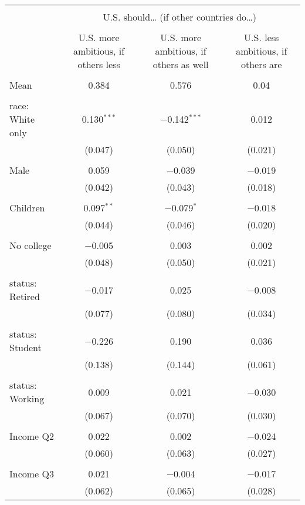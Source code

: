 
\begin{tabular}{@{\extracolsep{5pt}}lccc} 
\\[-1.8ex]\hline 
\hline \\[-1.8ex] 
 & \multicolumn{3}{c}{U.S. should… (if other countries do…)} \\ 
\cline{2-4} 
\\[-1.8ex] & U.S. more ambitious, if others less & U.S. more ambitious, if others as well & U.S. less ambitious, if others are \\ 
\hline \\[-1.8ex] 
 Mean & 0.384 & 0.576 & 0.04  \\ \hline \\[-1.8ex] race: White only & 0.130$^{***}$ & $-$0.142$^{***}$ & 0.012 \\ 
  & (0.047) & (0.050) & (0.021) \\ 
  & & & \\ 
 Male & 0.059 & $-$0.039 & $-$0.019 \\ 
  & (0.042) & (0.043) & (0.018) \\ 
  & & & \\ 
 Children & 0.097$^{**}$ & $-$0.079$^{*}$ & $-$0.018 \\ 
  & (0.044) & (0.046) & (0.020) \\ 
  & & & \\ 
 No college & $-$0.005 & 0.003 & 0.002 \\ 
  & (0.048) & (0.050) & (0.021) \\ 
  & & & \\ 
 status: Retired & $-$0.017 & 0.025 & $-$0.008 \\ 
  & (0.077) & (0.080) & (0.034) \\ 
  & & & \\ 
 status: Student & $-$0.226 & 0.190 & 0.036 \\ 
  & (0.138) & (0.144) & (0.061) \\ 
  & & & \\ 
 status: Working & 0.009 & 0.021 & $-$0.030 \\ 
  & (0.067) & (0.070) & (0.030) \\ 
  & & & \\ 
 Income Q2 & 0.022 & 0.002 & $-$0.024 \\ 
  & (0.060) & (0.063) & (0.027) \\ 
  & & & \\ 
 Income Q3 & 0.021 & $-$0.004 & $-$0.017 \\ 
  & (0.062) & (0.065) & (0.028) \\ 

\end{tabular}
